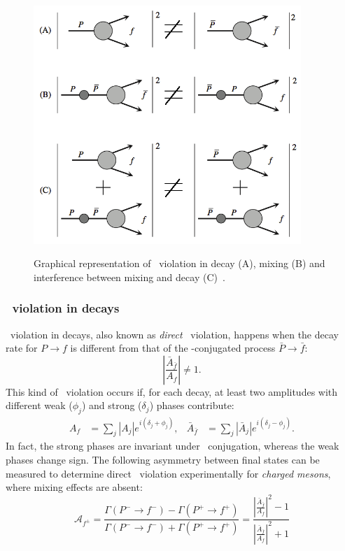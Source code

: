 \begin{figure}[htbp]
  \begin{center}
    \includegraphics[width=0.9\textwidth]{03BPhysics/figs/CPVclasses.png} \\
  \end{center}
  \vspace{-2mm}
  \caption{Graphical representation of \CP~violation in decay (A), mixing (B) and interference between mixing and decay (C)~\cite{CPviolation}.}
  \label{fig:CPVclasses}
\end{figure}

\subsubsection*{~violation in decays} 

\CP~violation in decays, also known as \emph{direct} \CP~violation, happens when the decay rate for $P \to f$ is different from that of the \CP-conjugated process $\bar P \to \bar f$:
\begin{equation}
	\left| \frac{\bar A_{\bar f}}{A_{f}} \right| \neq 1.
\end{equation}
This kind of \CP~violation occurs if, for each decay, at least two amplitudes with different weak ($\phi_j$) and strong ($\delta_j$) phases contribute:
\begin{align}
	A_f &= \sum_j |A_j| e^{i(\delta_j + \phi_j)}, & \bar A_{\bar f} &= \sum_j  |\bar A_j| e^{i(\delta_j - \phi_j)}.
\end{align}
In fact, the strong phases are invariant under \CP~conjugation, whereas the weak phases change sign. 
The following asymmetry between final states can be measured to determine direct \CP~violation experimentally for \emph{charged mesons}, where mixing effects are absent:
\begin{equation}
	\mathcal A_{f^{\pm}} = \frac{\Gamma(P^-\to f^-) - \Gamma(P^+\to f^+) }{\Gamma(P^-\to f^-) + \Gamma(P^+\to f^+)} = \frac{\left| \frac{\bar A_{\bar f}}{A_{f}} \right|^2-1}{\left| \frac{\bar A_{\bar f}}{A_{f}} \right|^2+1}
\end{equation}

